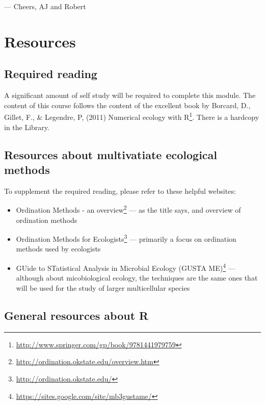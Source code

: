 \documentclass[english,10pt,a4paper,oneside]{book}
\renewcommand{\href}[2]{#2\footnote{\url{#1}}}
\let\rmarkdownfootnote\footnote%
\def\footnote{\protect\rmarkdownfootnote}
\providecommand{\tightlist}{%
  \setlength{\itemsep}{0pt}\setlength{\parskip}{0pt}}
\theoremstyle{definition}
\theoremstyle{definition}
\theoremstyle{definition}
\theoremstyle{remark}
\begin{document}
--- Cheers, AJ and Robert

\section*{Resources}\label{resources}

\subsection*{Required reading}\label{required-reading}

A significant amount of self study will be required to complete this
module. The content of this course follows the content of the excellent
book by Borcard, D., Gillet, F., \& Legendre, P, (2011)
\href{http://www.springer.com/gp/book/9781441979759}{Numerical ecology
with R}. There is a hardcopy in the Library.

\subsection*{Resources about multivatiate ecological
methods}\label{resources-about-multivatiate-ecological-methods}

To supplement the required reading, please refer to these helpful
websites:

\begin{itemize}
\tightlist
\item
  \href{http://ordination.okstate.edu/overview.htm}{Ordination Methods -
  an overview} --- as the title says, and overview of ordination methods
\item
  \href{http://ordination.okstate.edu/}{Ordination Methods for
  Ecologists} --- primarily a focus on ordination methods used by
  ecologists
\item
  \href{https://sites.google.com/site/mb3gustame/}{GUide to STatistical
  Analysis in Microbial Ecology (GUSTA ME)} --- although about
  micobiological ecology, the techniques are the same ones that will be
  used for the study of larger multicellular species
\end{itemize}

\subsection*{General resources about R}\label{general-resources-about-r}
\end{document}
